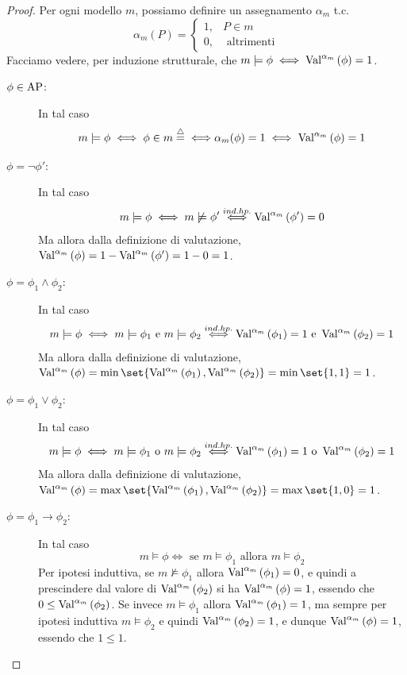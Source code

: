 \begin{proof}
  Per ogni modello \(m\), possiamo definire un assegnamento \(\alpha_{m}\) t.c.
  \[\alpha_{m}(P) = \begin{cases}
    1, & P \in m\\
    0, & \text{ altrimenti}
  \end{cases}\]
  Facciamo vedere, per induzione strutturale, che \(m\models \phi \iff \Val{\alpha_m}[\phi] = 1\).
  \begin{description}
    \item[\(\phi \in \AP\):] In tal caso
      \[m \models \phi \iff \phi \in m \eqdef {\iff}\alpha_m(\phi) = 1 \iff \Val{\alpha_m}[\phi] = 1\]
    \item[\(\phi = \neg \phi'\):] In tal caso
      \[m \models \phi \iff m \not\models \phi' \stackrel{ind. hp.}{\iff} \Val{\alpha_m}[\phi'] = 0\]
      Ma allora dalla definizione di valutazione, \(\Val{\alpha_m}[\phi] = 1-\Val{\alpha_m}[\phi'] = 1-0 = 1\).
    \item[\(\phi = \phi_1 \land \phi_2\):] In tal caso 
      \[m \models \phi \iff m \models \phi_1 \text{ e } m \models \phi_2 \overset{ind. hp.}{\iff} \Val{\alpha_m}[\phi_1] = 1 \text{ e } \Val{\alpha_m}[\phi_2] = 1\]
      Ma allora dalla definizione di valutazione, \(\Val{\alpha_m}[\phi] = \min\set{\Val{\alpha_m}[\phi_1], \Val{\alpha_m}[\phi_2]} = \min\set{1, 1} = 1\).
    \item[\(\phi = \phi_1 \lor \phi_2\):] In tal caso 
      \[m \models \phi \iff m \models \phi_1 \text{ o } m \models \phi_2 \overset{ind. hp.}{\iff} \Val{\alpha_m}[\phi_1] = 1 \text{ o } \Val{\alpha_m}[\phi_2] = 1\]
      Ma allora dalla definizione di valutazione, \(\Val{\alpha_m}[\phi] = \max\set{\Val{\alpha_m}[\phi_1], \Val{\alpha_m}[\phi_2]} = \max\set{1, 0} = 1\).
    \item[\(\phi = \phi_1 \rightarrow \phi_2\):] In tal caso 
      \[m \models \phi \iff \text{ se } m \models \phi_1 \text{ allora } m \models \phi_2\]
      Per ipotesi induttiva, se \(m \not\models \phi_1\) allora \(\Val{\alpha_m}[\phi_1] = 0\), e quindi a prescindere dal valore di \(\Val{\alpha_m}[\phi_2]\) si ha \(\Val{\alpha_m}[\phi] = 1\), essendo che \(0 \leq \Val{\alpha_m}[\phi_2]\).
      Se invece \(m \models \phi_1\) allora \(\Val{\alpha_m}[\phi_1] = 1\), ma sempre per ipotesi induttiva \(m \models \phi_2\) e quindi \(\Val{\alpha_m}[\phi_2] = 1\), e dunque \(\Val{\alpha_m}[\phi] = 1\), essendo che \(1 \leq 1\).
  \end{description}
\end{proof}

